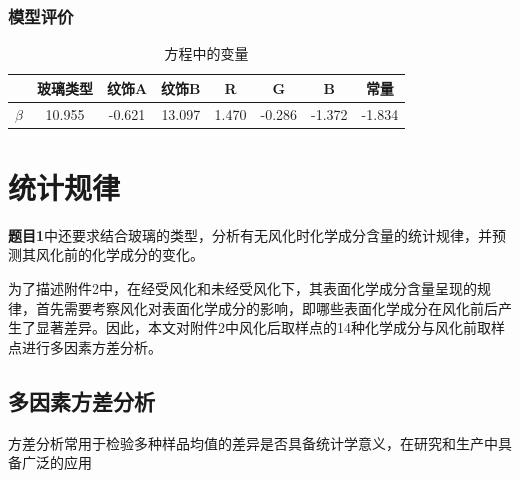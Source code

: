 \subsubsection{模型评价} %
\label{ssub:模型评价}

\begin{table}[!htp]
\setlength{\tabcolsep}{5mm}
\centering
\caption{方程中的变量}
\begin{tabular}{cccccccc}
\toprule
                            & 玻璃类型   & 纹饰A    & 纹饰B    & R     & G      & B      & 常量      \\
\midrule
\multicolumn{1}{l}{$\beta$} & 10.955 & -0.621 & 13.097 & 1.470 & -0.286 & -1.372 & -1.834  \\
\bottomrule
\end{tabular}
\end{table}






\section{统计规律} %
\label{sec:统计规律}

\textbf{题目1}中还要求结合玻璃的类型，分析有无风化时化学成分含量的统计规律，并预测其风化前的化学成分的变化。

为了描述附件2中，在经受风化和未经受风化下，其表面化学成分含量呈现的规律，首先需要考察风化对表面化学成分的影响，即哪些表面化学成分在风化前后产生了显著差异。因此，本文对附件2中风化后取样点的14种化学成分与风化前取样点进行多因素方差分析。

\subsection{多因素方差分析} %
\label{sub:多因素方差分析}

方差分析常用于检验多种样品均值的差异是否具备统计学意义，在研究和生产中具备广泛的应用


